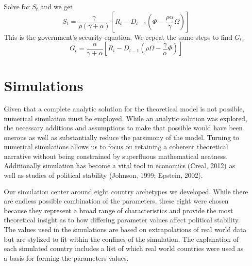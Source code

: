 \documentclass[12pt]{article}
\begin{document}
\begin{spacing}{1.5}
\noindent Solve for $S_t$ and we get
\begin{equation}
S_t=\frac{\gamma }{ \rho(\gamma+\alpha)} \left[ R_t - D_{t-1} \left(\Phi - \frac{\rho \alpha}{\gamma} \Omega \right) \right]
\end{equation}
\noindent This is the government's security equation. We repeat the same steps to find $G_t$. 
\begin{equation}
G_t=\frac{\alpha}{\gamma  +\alpha} \left[ R_t - D_{t-1} \left(\rho \Omega - \frac{\gamma}{\alpha} \Phi \right) \right]
\end{equation}


\section{Simulations} 

Given that a complete analytic solution for the theoretical model is not possible, numerical simulation must be employed. While an analytic solution was explored, the necessary additions and assumptions to make that possible would have been onerous as well as substantially reduce the parsimony of the model. Turning to numerical simulations allows us to focus on retaining a coherent theoretical narrative without being constrained by superfluous mathematical neatness. Additionally simulation has become a vital tool in economics (Creal, 2012) as well as studies of political stability (Johnson, 1999; Epstein, 2002).  

Our simulation center around eight country archetypes we developed. While there are endless possible combination of the parameters, these eight were chosen because they represent a broad range of characteristics and provide the most theoretical insight as to how differing parameter values affect political stability. The values used in the simulations are based on extrapolations of real world data but are stylized to fit within the confines of the simulation. The explanation of each simulated country includes a list of which real world countries were used as a basis for forming the parameters values. 


\end{spacing}
\end{document}
